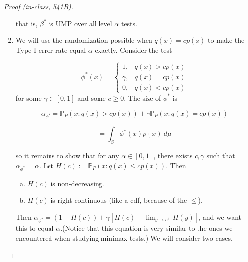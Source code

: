 \begin{proof}[Proof (in-class, 541B)]
\begin{enumerate}
that is, \(\beta^*\) is UMP over all level \(\alpha\) tests.

%
%
%
%

\item

We will use the randomization possible when \(q(x) = c p(x)\) to make the Type I error rate equal \(\alpha\) exactly. Consider the test 

\begin{equation}\label{mathstats.np.test.form}
\phi^*(x) = \begin{cases}
1, & q(x) > c p(x) \\
\gamma, & q(x) = c p(x) \\
0, & q(x) < c p(x)
\end{cases}
\end{equation}
for some \(\gamma \in [0,1]\) and some \(c \geq 0\). The size of \(\phi^*\) is 

\[
\alpha_{\phi^*} = \mathbb{P}_P(x : q(x) > c p(x)) + \gamma  \mathbb{P}_P(x : q(x) = c p(x))
\]

\[
= \int_S \phi^*(x) p(x) \ d\mu
\]

so it remains to show that for any \(\alpha \in [0,1]\), there exists \(c, \gamma\) such that \(\alpha_{\phi^*} = \alpha\). Let \(H(c) := \mathbb{P}_P(x: q(x) \leq c p (x) )\). Then

\begin{enumerate}[(a)]

\item \(H(c)\) is non-decreasing.

\item \(H(c)\) is right-continuous (like a cdf, because of the \(\leq\)).

\end{enumerate}

Then \(\alpha_{\phi^*} = (1 - H(c)) + \gamma[ H(c) - \lim_{y \to c^+} H(y) ]\), and we want this to equal \(\alpha\).(Notice that this equation is very similar to the ones we encountered when studying minimax tests.) We will consider two cases.

\begin{enumerate}[(a)]


\end{enumerate}
\end{enumerate}
\end{proof}
